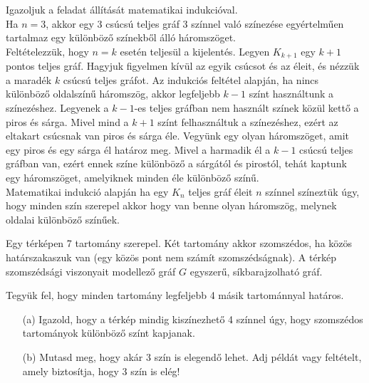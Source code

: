 \begin{solution}
	Igazoljuk a feladat állítását matematikai indukcióval.\\
	Ha $n=3$, akkor egy 3 csúcsú teljes gráf 3 színnel való színezése
	egyértelműen tartalmaz egy különböző színekből álló háromszöget.\\
	Feltételezzük, hogy $n=k$ esetén teljesül a kijelentés. Legyen $K_{k+1}$
	egy $k+1$ pontos teljes gráf. Hagyjuk figyelmen kívül az egyik csúcsot
	és az éleit, és nézzük a maradék $k$ csúcsú teljes gráfot. Az indukciós
	feltétel alapján, ha nincs különböző oldalszínű háromszög, akkor legfeljebb
	$k-1$ színt használtunk a színezéshez. Legyenek a $k-1$-es teljes
	gráfban nem használt színek közül kettő a piros és sárga. Mivel mind
	a $k+1$ színt felhasználtuk a színezéshez, ezért az eltakart csúcsnak
	van piros és sárga éle. Vegyünk egy olyan háromszöget, amit egy piros
	és egy sárga él határoz meg. Mivel a harmadik él a $k-1$ csúcsú teljes
	gráfban van, ezért ennek színe különböző a sárgától és pirostól, tehát
	kaptunk egy háromszöget, amelyiknek minden éle különböző színű.\\
	Matematikai indukció alapján ha egy $K_{n}$ teljes gráf éleit $n$
	színnel színeztük úgy, hogy minden szín szerepel akkor hogy van benne
	olyan háromszög, melynek oldalai különböző színűek. 
\end{solution}
\begin{extraproblem}
	Egy térképen 7 tartomány szerepel. Két tartomány akkor szomszédos,
	ha közös határszakaszuk van (egy közös pont nem számít szomszédságnak).
	A térkép szomszédsági viszonyait modellező gráf $G$ egyszerű, síkbarajzolható
	gráf.
	
	Tegyük fel, hogy minden tartomány legfeljebb 4 másik tartománnyal
	határos.
	\begin{enumerate}
		\item[(a)] Igazold, hogy a térkép mindig kiszínezhető 4 színnel úgy, hogy szomszédos
		tartományok különböző színt kapjanak. 
		\item[(b)] Mutasd meg, hogy akár 3 szín is elegendő lehet. Adj példát vagy feltételt,
		amely biztosítja, hogy 3 szín is elég! 
	\end{enumerate}
\end{extraproblem}

